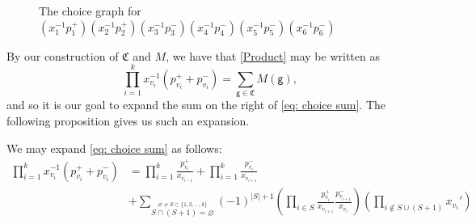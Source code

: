 \documentclass[ALCO,published]{cedram}
\numberwithin{equation}{section}
\renewcommand{\emptyset}{\varnothing}
\newcommand{\1}{^{-1}}
\begin{document}
\begin{figure}
\caption{The choice graph for $(x_{1}\1 p_{1}^+)(x_{2}\1 p_{2}^+)(x_{3}\1 p_{3}^-)(x_{4}\1 p_{4}^-)(x_{5}\1 p_{5}^-)(x_{6}\1 p_{6}^-)$}
\label{fig: choice graph}
\end{figure}
By our construction of $\mathfrak C$ and $M$, we have that \eqref{Product} may be written as
\begin{equation}\label{eq: choice sum}
\prod_{i=1}^k x_{v_i}\1 (p_{v_i}^+ + p_{v_i}^-) = \sum_{\mathsf g \in \mathfrak C} M(\mathsf g),
\end{equation}
and so it is our goal to expand the sum on the right of \eqref{eq: choice sum}. The following proposition gives us such an expansion.
\begin{prop}\label{cycle}
We may expand \eqref{eq: choice sum} as follows:
\begin{align}\label{cyclerel-eq}
\prod_{i=1}^k x_{v_i}\1 (p_{v_i}^+ + p_{v_i}^-) 
&= \prod_{i=1}^k \frac{p_{v_i}^+}{x_{v_{i-1}}} + \prod_{i=1}^k \frac{p_{v_i}^-}{x_{v_{i+1}}} \nonumber\\
&+ \sum_{\stackrel{\emptyset \neq S\subset \{1,2,\dots,k\}}{S\cap (S+1)=\emptyset}}(-1)^{|S|+1} \left(\prod_{i\in S} \frac{p_{v_i}^+}{x_{v_{i+1}}}\frac{p_{v_{i+1}}^-}{x_{v_i}}\right) \left(\prod_{i \notin S \cup (S+1)} x_{v_i}'\right)
\end{align}
\end{prop}
\end{document}
